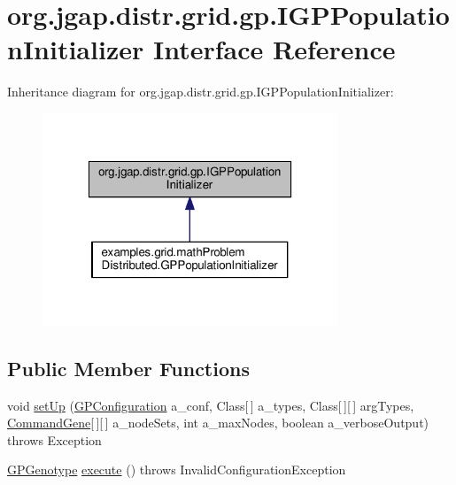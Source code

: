 \hypertarget{interfaceorg_1_1jgap_1_1distr_1_1grid_1_1gp_1_1_i_g_p_population_initializer}{\section{org.\-jgap.\-distr.\-grid.\-gp.\-I\-G\-P\-Population\-Initializer Interface Reference}
\label{interfaceorg_1_1jgap_1_1distr_1_1grid_1_1gp_1_1_i_g_p_population_initializer}
}


Inheritance diagram for org.\-jgap.\-distr.\-grid.\-gp.\-I\-G\-P\-Population\-Initializer\-:
\nopagebreak
\begin{figure}[H]
\begin{center}
\leavevmode
\includegraphics[width=250pt]{interfaceorg_1_1jgap_1_1distr_1_1grid_1_1gp_1_1_i_g_p_population_initializer__inherit__graph}
\end{center}
\end{figure}
\subsection*{Public Member Functions}
\begin{DoxyCompactItemize}
\item 
void \hyperlink{interfaceorg_1_1jgap_1_1distr_1_1grid_1_1gp_1_1_i_g_p_population_initializer_a266a9fea9fccfd0d5be2fe1984316f60}{set\-Up} (\hyperlink{classorg_1_1jgap_1_1gp_1_1impl_1_1_g_p_configuration}{G\-P\-Configuration} a\-\_\-conf, Class\mbox{[}$\,$\mbox{]} a\-\_\-types, Class\mbox{[}$\,$\mbox{]}\mbox{[}$\,$\mbox{]} arg\-Types, \hyperlink{classorg_1_1jgap_1_1gp_1_1_command_gene}{Command\-Gene}\mbox{[}$\,$\mbox{]}\mbox{[}$\,$\mbox{]} a\-\_\-node\-Sets, int a\-\_\-max\-Nodes, boolean a\-\_\-verbose\-Output)  throws Exception
\item 
\hyperlink{classorg_1_1jgap_1_1gp_1_1impl_1_1_g_p_genotype}{G\-P\-Genotype} \hyperlink{interfaceorg_1_1jgap_1_1distr_1_1grid_1_1gp_1_1_i_g_p_population_initializer_a7b28073eb751bf6bd811e1cf141c302e}{execute} ()  throws Invalid\-Configuration\-Exception
\end{DoxyCompactItemize}
